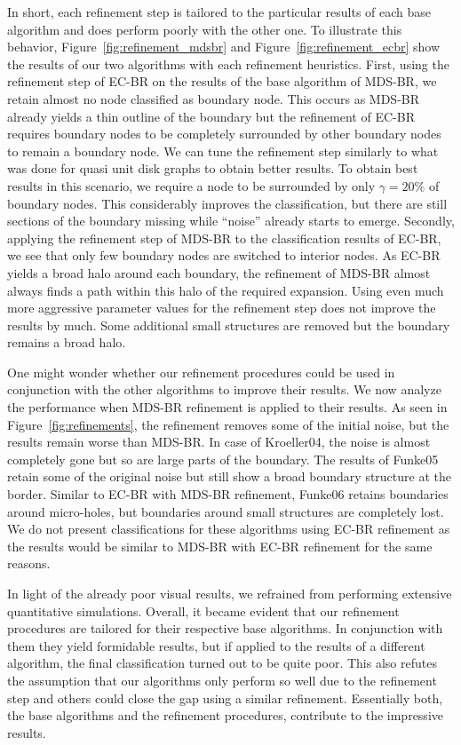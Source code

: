 \documentclass{llncs}
\begin{document}
In short, each refinement step is tailored to the particular results of each base algorithm and does perform poorly with the other one.
To illustrate this behavior, Figure~\ref{fig:refinement_mdsbr} and Figure~\ref{fig:refinement_ecbr} show the results of our two algorithms with each refinement heuristics.
First, using the refinement step of EC-BR on the results of the base algorithm of MDS-BR, we retain almost no node classified as boundary node.
This occurs as MDS-BR already yields a thin outline of the boundary but the refinement of EC-BR requires boundary nodes to be completely surrounded by other boundary nodes to remain a boundary node.
We can tune the refinement step similarly to what was done for quasi unit disk graphs to obtain better results.
To obtain best results in this scenario, we require a node to be surrounded by only $\gamma=20\%$ of boundary nodes.
This considerably improves the classification, but there are still sections of the boundary missing while ``noise'' already starts to emerge.
Secondly, applying the refinement step of MDS-BR to the classification results of EC-BR, we see that only few boundary nodes are switched to interior nodes.
As EC-BR yields a broad halo around each boundary, the refinement of MDS-BR almost always finds a path within this halo of the required expansion.
Using even much more aggressive parameter values for the refinement step does not improve the results by much.
Some additional small structures are removed but the boundary remains a broad halo.

One might wonder whether our refinement procedures could be used in conjunction with the other algorithms to improve their results.
We now analyze the performance when MDS-BR refinement is applied to their results.
As seen in Figure~\ref{fig:refinements}, the refinement removes some of the initial noise, but the results remain worse than MDS-BR.
In case of Kroeller04, the noise is almost completely gone but so are large parts of the boundary.
The results of Funke05 retain some of the original noise but still show a broad boundary structure at the border.
Similar to EC-BR with MDS-BR refinement, Funke06 retains boundaries around micro-holes, but boundaries around small structures are completely lost.
We do not present classifications for these algorithms using EC-BR refinement as the results would be similar to MDS-BR with EC-BR refinement for the same reasons.

In light of the already poor visual results, we refrained from performing extensive quantitative simulations.
Overall, it became evident that our refinement procedures are tailored for their respective base algorithms.
In conjunction with them they yield formidable results, but if applied to the results of a different algorithm, the final classification turned out to be quite poor.
This also refutes the assumption that our algorithms only perform so well due to the refinement step and others could close the gap using a similar refinement.
Essentially both, the base algorithms and the refinement procedures, contribute to the impressive results.
\end{document}
